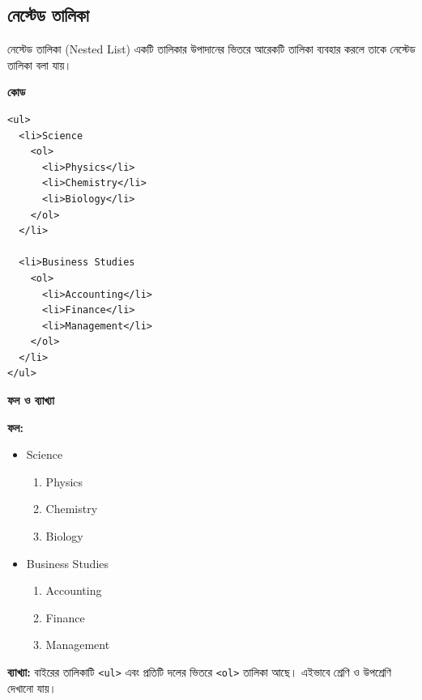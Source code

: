 

\subsection{নেস্টেড তালিকা}

\begin{definitionbox}{নেস্টেড তালিকা (Nested List)}
একটি তালিকার উপাদানের ভিতরে আরেকটি তালিকা ব্যবহার করলে তাকে নেস্টেড তালিকা বলা যায়।
\end{definitionbox}

\par\noindent
\begin{minipage}[t]{.50\linewidth}\vspace{0pt}\small
\textbf{\color{chFourTeal}কোড}\par
\par\noindent
\begin{verbatim}
<ul>
  <li>Science
    <ol>
      <li>Physics</li>
      <li>Chemistry</li>
      <li>Biology</li>
    </ol>
  </li>

  <li>Business Studies
    <ol>
      <li>Accounting</li>
      <li>Finance</li>
      <li>Management</li>
    </ol>
  </li>
</ul>
\end{verbatim}
\par
\par\smallskip
\end{minipage}\hfill
\begin{minipage}[t]{.46\linewidth}\vspace{0pt}\small
\textbf{\color{chFourTeal}ফল ও ব্যাখ্যা}\par
\textbf{ফল:}
\begin{itemize}
\item Science
  \begin{enumerate}
  \item Physics
  \item Chemistry
  \item Biology
  \end{enumerate}
\item Business Studies
  \begin{enumerate}
  \item Accounting
  \item Finance
  \item Management
  \end{enumerate}
\end{itemize}
\textbf{ব্যাখ্যা:} বাইরের তালিকাটি \texttt{<ul>} এবং প্রতিটি দলের ভিতরে \texttt{<ol>} তালিকা আছে। এইভাবে শ্রেণি ও উপশ্রেণি দেখানো যায়।
\par\smallskip
\end{minipage}\par


